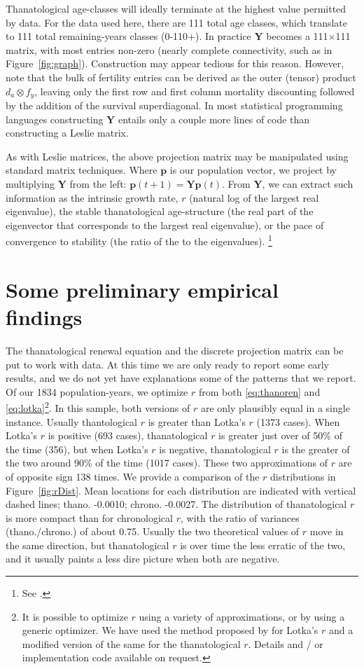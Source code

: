 \documentclass{article}
\begin{document}
Thanatological age-classes will ideally terminate at the highest value permitted
by data. For the data used here, there are 111 total age classes, which
translate to 111 total remaining-years classes (0-110+). In practice $\textbf{Y}$ becomes
a 111$\times$111 matrix, with most entries non-zero (nearly complete
connectivity, such as in Figure~\ref{fig:graph}). Construction may appear tedious for
this reason. However, note that the bulk of fertility entries can be derived as the outer (tensor) product $d_a \otimes f_y$, leaving only the first row and first column mortality discounting followed by the addition of the
survival superdiagonal. In most statistical programming languages constructing $\textbf{Y}$ entails only
a couple more lines of code than constructing a Leslie matrix.

As with Leslie matrices, the above projection matrix may be manipulated using
standard matrix techniques. Where $\textbf{p}$ is our population vector, we
project by multiplying $\textbf{Y}$ from the left: $\textbf{p}(t + 1) =
\textbf{Y}\textbf{p}(t)$. From $\textbf{Y}$, we can extract such information as 
the intrinsic growth rate, $r$ (natural log of the largest
real eigenvalue), the stable thanatological age-structure (the real part of the
eigenvector that corresponds to the largest real eigenvalue), or the pace of
convergence to stability (the ratio of the  to the  eigenvalues).
\footnote{See \citet[p.86-87]{caswell2001matrix}.}

\section*{Some preliminary empirical findings}
The thanatological renewal equation and the discrete projection matrix can be
put to work with data. At this time we are only ready to report some early
results, and we do not yet have explanations some of the patterns that we
report. Of our 1834 population-years, we optimize $r$ from both
\eqref{eq:thanoren} and \eqref{eq:lotka}\footnote{It is possible to optimize $r$ using a variety of approximations, or by using a generic optimizer. We have used the method proposed by \citet{coale1957new} for Lotka's $r$ and a modified version of the same for
the thanatological $r$. Details and / or implementation code available on
request.}. In this sample, both versions of $r$ are only plausibly equal in a
single instance. Usually thantological $r$ is greater than Lotka's $r$ (1373
cases). When Lotka's $r$ is positive (693 cases), thanatological $r$ is greater
just over of 50\% of the time (356), but when Lotka's $r$ is negative,
thanatological $r$ is the greater of the two around 90\% of the time (1017
cases). These two approximations of $r$ are of opposite sign 138 times. We
provide a comparison of the $r$ distributions in Figure~\ref{fig:rDist}. Mean
locations for each distribution are indicated with vertical dashed lines; thano.
-0.0010; chrono. -0.0027. The distribution of thanatological $r$ is more compact
than for chronological $r$, with the ratio of variances (thano./chrono.) of
about 0.75. Usually the two theoretical values of $r$ move in the same direction, but thanatological $r$
is over time the less erratic of the two, and it usually paints a less dire picture when both are negative.
\end{document}
